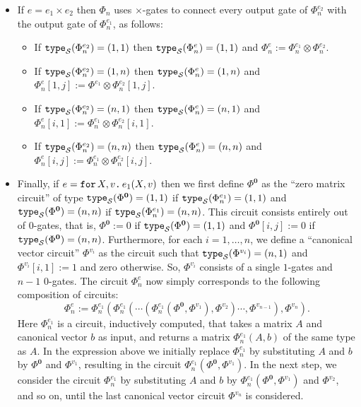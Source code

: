 \begin{itemize}
\begin{itemize}
\end{itemize}
\item If $e=e_1\times e_2$ then $\Phi_n$ uses $\times$-gates to connect every output gate of $\Phi_n^{e_2}$ with the output gate of $\Phi_n^{e_1}$, as follows:
\begin{itemize}
	\item If $\texttt{type}_{\mathcal{S}}(\Phi^{e_2}_n)=(1, 1)$  then $\texttt{type}_{\mathcal{S}}(\Phi^{e}_n)=(1, 1)$ and $\Phi^e_n:=\Phi^{e_1}_n \otimes \Phi^{e_2}_n$.
  \item If $\texttt{type}_{\mathcal{S}}(\Phi^{e_2}_n)=(1, n)$  then $\texttt{type}_{\mathcal{S}}(\Phi^{e}_n)=(1, n)$ and $\Phi^e_n[1,j]:=\Phi^{e_1} \otimes \Phi^{e_2}_n[1,j]$.
  \item If $\texttt{type}_{\mathcal{S}}(\Phi^{e_2}_n)=(n, 1)$  then $\texttt{type}_{\mathcal{S}}(\Phi^{e}_n)=(n, 1)$ and $\Phi^e_n[i,1]:=\Phi^{e_1}_n \otimes \Phi^{e_2}_n[i,1]$.
  \item If $\texttt{type}_{\mathcal{S}}(\Phi^{e_2}_n)=(n, n)$  then $\texttt{type}_{\mathcal{S}}(\Phi^{e}_n)=(n, n)$ and $\Phi^e_n[i,j]:=\Phi^{e_1}_n \otimes \Phi^{e_2}_n[i,j]$.
\end{itemize}

\item Finally, if $e=\texttt{for}\, X,v \texttt{.}\, e_1(X, v)$ then  we first  define $\Phi^{\mathbf{0}}$ 
as the ``zero matrix circuit'' of type  $\texttt{type}_{\mathcal{S}}(\Phi^{\mathbf{0}})=(1,1)$ if $\texttt{type}_{\mathcal{S}}(\Phi^{e_1}_n)=(1,1)$ and 
$\texttt{type}_{\mathcal{S}}(\Phi^{\mathbf{0}})=(n,n)$ if $\texttt{type}_{\mathcal{S}}(\Phi^{e_1}_n)=(n,n)$.  This circuit consists entirely out of $0$-gates,
that is, $\Phi^{\mathbf{0}}:=0$ if $\texttt{type}_{\mathcal{S}}(\Phi^{\mathbf{0}})=(1,1)$ and
$\Phi^{\mathbf{0}}[i,j]:=0$ if $\texttt{type}_{\mathcal{S}}(\Phi^{\mathbf{0}})=(n,n)$.
Furthermore, for each $i=1,\ldots, n$, we define a ``canonical vector circuit'' $\Phi^{v_i}$ as the circuit such that $\texttt{type}_{\mathcal{S}}(\Phi^{v_i})=(n,1)$ and $\Phi^{v_i}[i,1]:=1$ and zero otherwise. So, $\Phi^{v_i}$ consists of a single $1$-gates and $n-1$ $0$-gates.
The circuit $\Phi_n^e$ now simply corresponds to the following composition of circuits:
$$\Phi^{e}_n:=\Phi^{e_1}_n\left( \Phi^{e_1}_n \left( \cdots \left( \Phi^{e_1}_n\left( \Phi^{\mathbf{0}}, \Phi^{v_1}\right), \Phi^{v_2}\right)\cdots, \Phi^{v_{n-1}} \right), \Phi^{v_n} \right).$$
Here $\Phi_n^{e_1}$ is a circuit, inductively computed, that takes a matrix $A$ and canonical vector $b$ as input, and returns a matrix $\Phi_n^{e_1}(A,b)$ of the same type as $A$. In the expression above we initially replace $\Phi_n^{e_1}$ by substituting $A$ and $b$ by $\Phi^{\mathbf{0}}$ and $\Phi^{v_1}$, resulting in the circuit 
$\Phi_n^{e_1}(\Phi^{\mathbf{0}},\Phi^{v_1})$. In the next step, we consider the circuit $\Phi_n^{e_1}$ by substituting $A$ and $b$ by $\Phi_n^{e_1}(\Phi^{\mathbf{0}},\Phi^{v_1})$ and 
$\Phi^{v_2}$, and so on, until the last canonical vector circuit $\Phi^{v_n}$ is considered.
\end{itemize}

